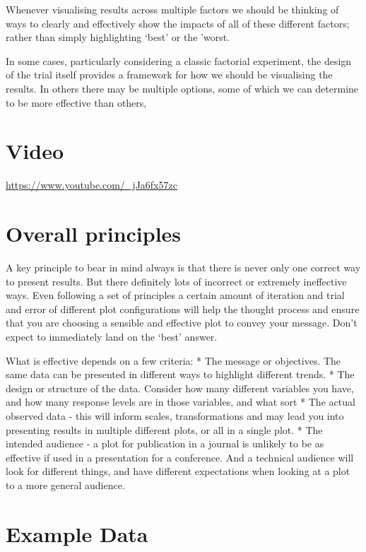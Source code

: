 \documentclass[
  titlepage]{book}
\begin{document}
Whenever visualising results across multiple factors we should be thinking of ways to clearly and effectively show the impacts of all of these different factors; rather than simply highlighting `best' or the 'worst.

In some cases, particularly considering a classic factorial experiment, the design of the trial itself provides a framework for how we should be visualising the results. In others there may be multiple options, some of which we can determine to be more effective than others,

\hypertarget{video-2}{%
\section{Video}\label{video-2}}

\label{fig:unnamed-chunk-6}\url{https://www.youtube.com/_jJa6fx57zc}

\hypertarget{overall-principles}{%
\section{Overall principles}\label{overall-principles}}

A key principle to bear in mind always is that there is never only one correct way to present results. But there definitely lots of incorrect or extremely ineffective ways. Even following a set of principles a certain amount of iteration and trial and error of different plot configurations will help the thought process and ensure that you are choosing a sensible and effective plot to convey your message. Don't expect to immediately land on the `best' answer.

What is effective depends on a few criteria:
* The message or objectives. The same data can be presented in different ways to highlight different trends.
* The design or structure of the data. Consider how many different variables you have, and how many response levels are in those variables, and what sort
* The actual observed data - this will inform scales, transformations and may lead you into presenting results in multiple different plots, or all in a single plot.
* The intended audience - a plot for publication in a journal is unlikely to be as effective if used in a presentation for a conference. And a technical audience will look for different things, and have different expectations when looking at a plot to a more general audience.

\hypertarget{example-data}{%
\section{Example Data}\label{example-data}}
\end{document}
